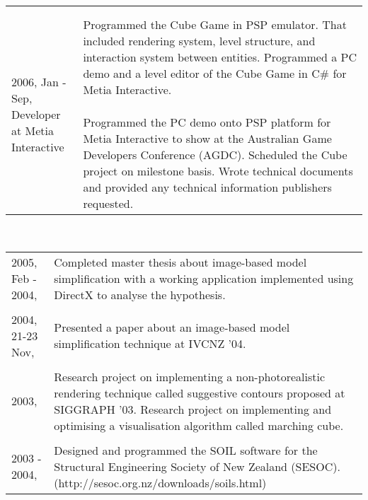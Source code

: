 \begin{resume}
\begin{tabular}{ll}
{}\\\\
\parbox[t]{35mm}{2006, Jan - Sep,\\Developer\\at Metia Interactive} & \parbox[t]{111mm}{

Programmed the Cube Game in PSP emulator. That included rendering system, level structure, and interaction system between entities. Programmed a PC demo and a level editor of the Cube Game in C\# for Metia Interactive.
\\\\
Programmed the PC demo onto PSP platform for Metia Interactive to show at the Australian Game Developers Conference (AGDC). Scheduled the Cube project on milestone basis. Wrote technical documents and provided any technical information publishers requested.

}\end{tabular}\\
\begin{tabular}{ll}
\parbox[t]{35mm}{2005, Feb - \\ 2004,} & \parbox[t]{111mm}{

Completed master thesis about image-based model simplification with a working application implemented using DirectX to analyse the hypothesis.

}\\\\
\parbox[t]{35mm}{2004, 21-23 Nov,} & \parbox[t]{111mm}{

Presented a paper about an image-based model simplification technique at IVCNZ '04.

}\\\\
\parbox[t]{35mm}{2003,} & \parbox[t]{111mm}{

Research project on implementing a non-photorealistic rendering technique called suggestive contours proposed at SIGGRAPH '03. Research project on implementing and optimising a visualisation algorithm called marching cube.

}\\\\
\parbox[t]{35mm}{2003 - 2004,} & \parbox[t]{111mm}{

Designed and programmed the SOIL software for the Structural Engineering Society of New Zealand (SESOC).\\(http://sesoc.org.nz/downloads/soils.html)

}\end{tabular} 


\end{resume}
